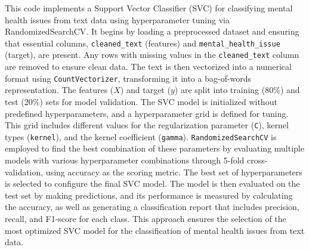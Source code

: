 \noindent
This code implements a Support Vector Classifier (SVC) for classifying mental health issues from text data using hyperparameter tuning via RandomizedSearchCV. It begins by loading a preprocessed dataset and ensuring that essential columns, \texttt{cleaned\_text} (features) and \texttt{mental\_health\_issue} (target), are present. Any rows with missing values in the \texttt{cleaned\_text} column are removed to ensure clean data. The text is then vectorized into a numerical format using \texttt{CountVectorizer}, transforming it into a bag-of-words representation. The features (\(X\)) and target (\(y\)) are split into training (80\%) and test (20\%) sets for model validation. The SVC model is initialized without predefined hyperparameters, and a hyperparameter grid is defined for tuning. This grid includes different values for the regularization parameter (\texttt{C}), kernel types (\texttt{kernel}), and the kernel coefficient (\texttt{gamma}). \texttt{RandomizedSearchCV} is employed to find the best combination of these parameters by evaluating multiple models with various hyperparameter combinations through 5-fold cross-validation, using accuracy as the scoring metric. The best set of hyperparameters is selected to configure the final SVC model. The model is then evaluated on the test set by making predictions, and its performance is measured by calculating the accuracy, as well as generating a classification report that includes precision, recall, and F1-score for each class. This approach ensures the selection of the most optimized SVC model for the classification of mental health issues from text data.

